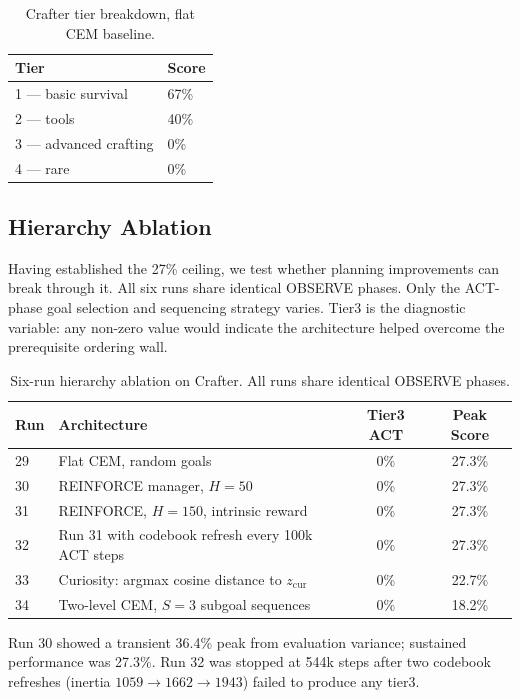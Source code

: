 \documentclass[12pt]{article}
\begin{document}
\begin{table}[h]
\centering
\caption{Crafter tier breakdown, flat CEM baseline.}
\label{tab:crafter_tiers}
\begin{tabular}{ll}
\toprule
Tier & Score \\
\midrule
1 — basic survival & 67\% \\
2 — tools & 40\% \\
3 — advanced crafting & 0\% \\
4 — rare & 0\% \\
\bottomrule
\end{tabular}
\end{table}

\subsection{Hierarchy Ablation}

Having established the 27\% ceiling, we test whether planning improvements can break through it. All six runs share identical OBSERVE phases. Only the ACT-phase goal selection and sequencing strategy varies. Tier3 is the diagnostic variable: any non-zero value would indicate the architecture helped overcome the prerequisite ordering wall.

\begin{table}[h]
\centering
\caption{Six-run hierarchy ablation on Crafter. All runs share identical OBSERVE phases.}
\label{tab:ablation}
\begin{tabular}{llcc}
\toprule
Run & Architecture & Tier3 ACT & Peak Score \\
\midrule
29 & Flat CEM, random goals & 0\% & 27.3\% \\
30 & REINFORCE manager, $H=50$ & 0\% & 27.3\% \\
31 & REINFORCE, $H=150$, intrinsic reward & 0\% & 27.3\% \\
32 & Run 31 with codebook refresh every 100k ACT steps & 0\% & 27.3\% \\
33 & Curiosity: argmax cosine distance to $z_\text{cur}$ & 0\% & 22.7\% \\
34 & Two-level CEM, $S=3$ subgoal sequences & 0\% & 18.2\% \\
\bottomrule
\end{tabular}
\end{table}

Run 30 showed a transient 36.4\% peak from evaluation variance; sustained performance was 27.3\%. Run 32 was stopped at 544k steps after two codebook refreshes (inertia $1059 \to 1662 \to 1943$) failed to produce any tier3.
\end{document}
